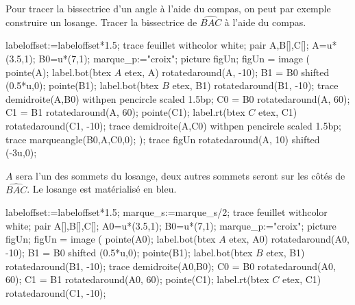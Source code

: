 \begin{changemargin}{0mm}{-15mm}
    \begin{methode}
        Pour tracer la bissectrice d'un angle à l'aide du compas, on peut par exemple construire un losange.
        \exercice
        Tracer la bissectrice de $\widehat{BAC}$ à l'aide du compas. \par\vspace*{5mm}
        \begin{Geometrie}[CoinHD={(6.5u,5u)}]
            labeloffset:=labeloffset*1.5;
            trace feuillet withcolor white;
            pair A,B[],C[];
            A=u*(3.5,1);
            B0=u*(7,1);
            marque_p:="croix";
            picture figUn;
            figUn = image (
                pointe(A);
                label.bot(btex $A$ etex, A) rotatedaround(A, -10);
                B1 = B0 shifted (0.5*u,0);
                pointe(B1);
                label.bot(btex $B$ etex, B1)  rotatedaround(B1, -10);
                trace demidroite(A,B0) withpen pencircle scaled 1.5bp;
                C0 = B0 rotatedaround(A, 60);
                C1 = B1 rotatedaround(A, 60);
                pointe(C1);
                label.rt(btex $C$ etex, C1)  rotatedaround(C1, -10);            
                trace demidroite(A,C0) withpen pencircle scaled 1.5bp;
                trace marqueangle(B0,A,C0,0);
            );
            trace figUn rotatedaround(A, 10) shifted (-3u,0);
        \end{Geometrie}
        \correction
        $A$ sera l'un des sommets du losange, deux autres sommets seront sur les côtés de $\widehat{BAC}$. Le losange est matérialisé en bleu.\par\vspace*{5mm}
        \begin{Geometrie}[CoinHD={(8.5u,5u)}]
            labeloffset:=labeloffset*1.5;
            marque_s:=marque_s/2;
            trace feuillet withcolor white;
            pair A[],B[],C[];
            A0=u*(3.5,1);
            B0=u*(7,1);
            marque_p:="croix";
            picture figUn;
            figUn = image (
                pointe(A0);
                label.bot(btex $A$ etex, A0) rotatedaround(A0, -10);
                B1 = B0 shifted (0.5*u,0);
                pointe(B1);
                label.bot(btex $B$ etex, B1)  rotatedaround(B1, -10);
                trace demidroite(A0,B0);
                C0 = B0 rotatedaround(A0, 60);
                C1 = B1 rotatedaround(A0, 60);
                pointe(C1);
                label.rt(btex $C$ etex, C1)  rotatedaround(C1, -10);            

\end{Geometrie}
\end{methode}
\end{changemargin}
